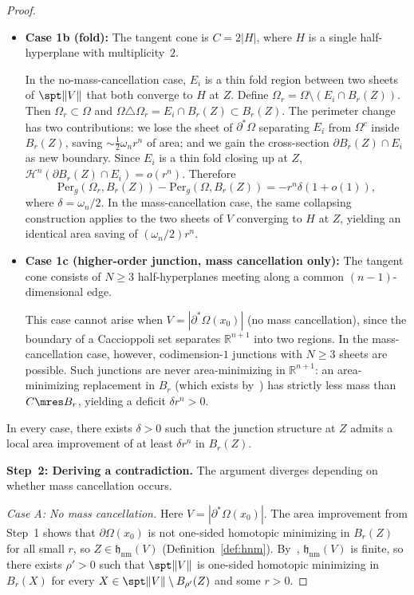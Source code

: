 \begin{proof}
\begin{itemize}
    \item \textbf{Case 1b (fold):} The tangent cone is $C = 2|H|$, where $H$ is a single half-hyperplane with multiplicity~$2$.

    In the no-mass-cancellation case, $E_i$ is a thin fold region between two sheets of $\spt\|V\|$ that both converge to $H$ at $Z$. Define $\Omega_r = \Omega \setminus (E_i \cap B_r(Z))$. Then $\Omega_r \subset \Omega$ and $\Omega \triangle \Omega_r = E_i \cap B_r(Z) \subset B_r(Z)$. The perimeter change has two contributions: we lose the sheet of $\partial^*\Omega$ separating $E_i$ from $\Omega^c$ inside $B_r(Z)$, saving $\sim \tfrac{1}{2}\omega_n r^n$ of area; and we gain the cross-section $\partial B_r(Z) \cap E_i$ as new boundary. Since $E_i$ is a thin fold closing up at $Z$, $\mathcal{H}^n(\partial B_r(Z) \cap E_i) = o(r^n)$. Therefore
    \[
        \mathrm{Per}_g(\Omega_r, B_r(Z)) - \mathrm{Per}_g(\Omega, B_r(Z)) = -r^n \delta(1 + o(1)),
    \]
    where $\delta = \omega_n / 2$. In the mass-cancellation case, the same collapsing construction applies to the two sheets of $V$ converging to $H$ at $Z$, yielding an identical area saving of $(\omega_n/2) r^n$.

    \item \textbf{Case 1c (higher-order junction, mass cancellation only):} The tangent cone consists of $N \geq 3$ half-hyperplanes meeting along a common $(n-1)$-dimensional edge.

    This case cannot arise when $V = |\partial^*\Omega(x_0)|$ (no mass cancellation), since the boundary of a Caccioppoli set separates $\mathbb{R}^{n+1}$ into two regions. In the mass-cancellation case, however, codimension-$1$ junctions with $N \geq 3$ sheets are possible. Such junctions are never area-minimizing in $\mathbb{R}^{n+1}$: an area-minimizing replacement in $B_r$ (which exists by~\cite[Theorem~5.1.6]{Fed69}) has strictly less mass than $C \mres B_r$, yielding a deficit $\delta r^n > 0$.
\end{itemize}

In every case, there exists $\delta > 0$ such that the junction structure at $Z$ admits a local area improvement of at least $\delta r^n$ in $B_r(Z)$.

\medskip\noindent\textbf{Step~2: Deriving a contradiction.}
The argument diverges depending on whether mass cancellation occurs.

\medskip\noindent\emph{Case A: No mass cancellation.}
Here $V = |\partial^*\Omega(x_0)|$. The area improvement from Step~1 shows that $\partial\Omega(x_0)$ is not one-sided homotopic minimizing in $B_r(Z)$ for all small $r$, so $Z \in \mathfrak{h}_{\mathrm{nm}}(V)$ (Definition~\ref{def:hnm}). By~\cite[Proposition~3.1]{CLS22}, $\mathfrak{h}_{\mathrm{nm}}(V)$ is finite, so there exists $\rho' > 0$ such that $\spt\|V\|$ is one-sided homotopic minimizing in $B_r(X)$ for every $X \in \spt\|V\| \setminus B_{\rho'}(Z)$ and some $r > 0$.


\end{proof}
